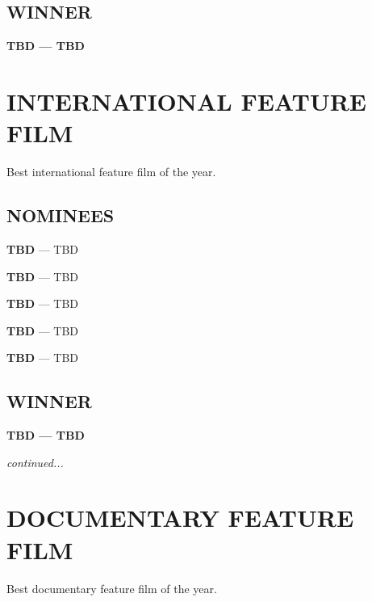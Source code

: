 \documentclass[letterpaper]{extarticle}
\begin{document}
  \subsection*{{\selectfont WINNER}}
  \textcolor{oscaryellow}{\textbf{{\selectfont TBD} — TBD}}

  \section*{\textcolor{oscaryellow}{{\selectfont INTERNATIONAL FEATURE FILM}}}
  \vspace{-6pt}
  {\selectfont Best international feature film of the year.}
  \subsection*{{\selectfont NOMINEES}}
  \begin{multicols}{2}
    \begin{itemize}
      \begin{small}
        \item \textbf{{\selectfont TBD}} — TBD
        \item \textbf{{\selectfont TBD}} — TBD
        \item \textbf{{\selectfont TBD}} — TBD
        \item \textbf{{\selectfont TBD}} — TBD
        \item \textbf{{\selectfont TBD}} — TBD
      \end{small}
    \end{itemize}
  \end{multicols}

  \subsection*{{\selectfont WINNER}}
  \textcolor{oscaryellow}{\textbf{{\selectfont TBD} — TBD}}

  \mbox{}
  \vfill
  \textit{continued...}

  \newpage

  \section*{\textcolor{oscaryellow}{{\selectfont DOCUMENTARY FEATURE FILM}}}
  \vspace{-6pt}
  {\selectfont Best documentary feature film of the year.}
\end{document}
